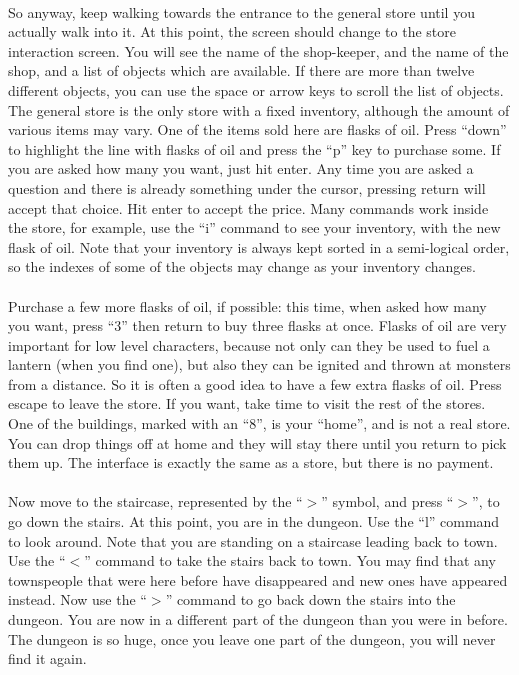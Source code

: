 \paragraph{}So anyway, keep walking towards the entrance to the general store until
you actually walk into it. At this point, the screen should change to
the store interaction screen. You will see the name of the shop-keeper,
and the name of the shop, and a list of objects which are available. If
there are more than twelve different objects, you can use the space or
arrow keys to scroll the list of objects. The general store is the only
store with a fixed inventory, although the amount of various items may
vary. One of the items sold here are flasks of oil. Press ``down'' to
highlight the line with flasks of oil and press the ``p'' key to purchase
some. If you are asked how many you want, just hit enter. Any time you
are asked a question and there is already something under the cursor,
pressing return will accept that choice. Hit enter to accept the price.
Many commands work inside the store, for example, use the ``i'' command to
see your inventory, with the new flask of oil. Note that your inventory
is always kept sorted in a semi-logical order, so the indexes of some of
the objects may change as your inventory changes.

\paragraph{}Purchase a few more flasks of oil, if possible: this time, when asked
how many you want, press ``3'' then return to buy three flasks at once.
Flasks of oil are very important for low level characters, because not
only can they be used to fuel a lantern (when you find one), but also
they can be ignited and thrown at monsters from a distance. So it is
often a good idea to have a few extra flasks of oil. Press escape to
leave the store. If you want, take time to visit the rest of the
stores. One of the buildings, marked with an ``8'', is your ``home'', and
is not a real store. You can drop things off at home and they will stay
there until you return to pick them up. The interface is exactly the
same as a store, but there is no payment.

\paragraph{}Now move to the staircase, represented by the ``$>$'' symbol,
and press ``$>$'', to go down the stairs. At this point, you are in the
dungeon. Use the ``l'' command to look around. Note that you are standing
on a staircase leading back to town. Use the ``$<$'' command to take the
stairs back to town. You may find that any townspeople that were here
before have disappeared and new ones have appeared instead. Now use the
``$>$'' command to go back down the stairs into the dungeon. You are now
in a different part of the dungeon than you were in before. The dungeon
is so huge, once you leave one part of the dungeon, you will never find
it again.

